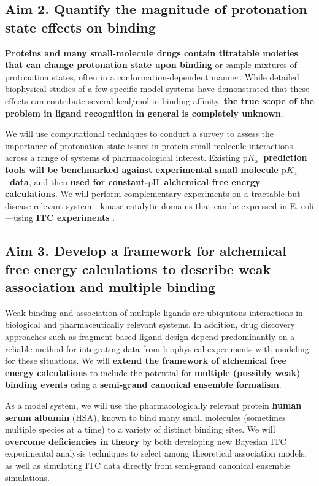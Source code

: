 \documentclass[10pt,final]{article}
\newcommand{\pKa}{$\mathrm{p}K_\mathrm{a}$\ }
\newcommand{\pH}{$\mathrm{pH}$\ }
\begin{document}
\subsection*{Aim 2. Quantify the magnitude of protonation state effects on binding}
\textbf{Proteins and many small-molecule drugs contain titratable moieties that can change protonation state upon binding} or sample mixtures of protonation states, often in a conformation-dependent manner.
While detailed biophysical studies of a few specific model systems have demonstrated that these effects can contribute several kcal/mol in binding affinity, \textbf{the true scope of the problem in ligand recognition in general is completely unknown}.

We will use computational techniques to conduct a survey to assess the importance of protonation state issues in protein-small molecule interactions across a range of systems of pharmacological interest.
Existing \textbf{ \pKa prediction tools will be benchmarked against experimental small molecule \pKa data}, and then \textbf{ used for constant-\pH alchemical free energy calculations}.
We will perform complementary experiments on a tractable but disease-relevant system---kinase catalytic domains that can be expressed in E. coli---using \textbf{ ITC experiments }.

\subsection*{Aim 3. Develop a framework for alchemical free energy calculations to describe weak association and multiple binding}
Weak binding and association of multiple ligands are ubiquitous interactions in biological and pharmaceutically relevant systems.
In addition, drug discovery approaches such as fragment-based ligand design depend predominantly on a reliable method for integrating data from biophysical experiments with modeling for these situations.
We will \textbf{ extend the framework of alchemical free energy calculations}  to include the potential for \textbf{ multiple (possibly weak) binding events } using a \textbf{ semi-grand canonical ensemble formalism}.

As a model system, we will use the pharmacologically relevant protein \textbf{ human serum albumin } (HSA), known to bind many small molecules (sometimes multiple species at a time) to a variety of distinct binding sites.
We will  \textbf{ overcome deficiencies in theory } by both developing new Bayesian ITC experimental analysis techniques to select among theoretical association models, as well as simulating ITC data directly from semi-grand canonical ensemble simulations.
\end{document}
